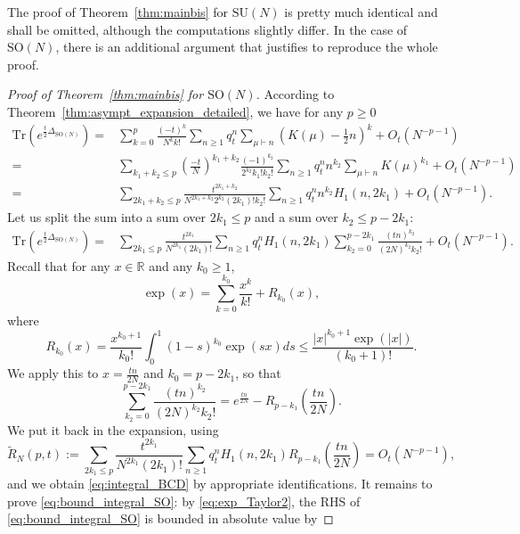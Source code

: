 \documentclass[11pt,a4paper,reqno]{article}
\theoremstyle{definition}
\theoremstyle{remark}
\newcommand\SU{{\mathrm{SU}}}
\newcommand\SO{{\mathrm{SO}}}
\newcommand\R{\mathbb{R}}
\newcommand\Tr{\mathrm{Tr}}
\begin{document}
The proof of Theorem~\ref{thm:mainbis} for $\SU(N)$ is pretty much identical and shall be omitted, although the computations slightly differ. In the case of $\SO(N)$, there is an additional argument that justifies to reproduce the whole proof.

\begin{proof}[Proof of Theorem~\ref{thm:mainbis} for $\SO(N)$]
According to Theorem~\ref{thm:asympt_expansion_detailed}, we have for any $p\geq 0$
\begin{align*}
\Tr(e^{\frac{t}{2}\Delta_{\SO(N)}})= & \sum_{k=0}^p\frac{(-t)^k}{N^kk!}\sum_{n\geq 1}q_t^n\sum_{\mu\vdash n}\left(K(\mu)-\frac12n\right)^k+O_t(N^{-p-1})\\
= & \sum_{k_1+k_2\leq p}\left(\frac{-t}{N}\right)^{k_1+k_2}\frac{(-1)^{k_2}}{2^{k_2}k_1!k_2!}\sum_{n\geq 1}q_t^nn^{k_2}\sum_{\mu\vdash n}K(\mu)^{k_1}+O_t(N^{-p-1})\\
= & \sum_{2k_1+k_2\leq p}\frac{t^{2k_1+k_2}}{N^{2k_1+k_2}2^{k_2}(2k_1)!k_2!}\sum_{n\geq 1}q_t^nn^{k_2}H_1(n,2k_1)+O_t(N^{-p-1}).
\end{align*}
Let us split the sum into a sum over $2k_1\leq p$ and a sum over $k_2\leq p-2k_1$:
\begin{align*}
\Tr(e^{\frac{t}{2}\Delta_{\SO(N)}})= & \sum_{2k_1\leq p}\frac{t^{2k_1}}{N^{2k_1}(2k_1)!}\sum_{n\geq 1}q_t^nH_1(n,2k_1) \sum_{k_2=0}^{p-2k_1}\frac{(tn)^{k_2}}{(2N)^{k_2}k_2!}+O_t(N^{-p-1}).
\end{align*}
Recall that for any $x\in\R$ and any $k_0\geq 1$,
\begin{equation}\label{eq:exp_Taylor}
\exp(x)=\sum_{k=0}^{k_0}\frac{x^k}{k!}+R_{k_0}(x),
\end{equation}
where
\begin{equation}\label{eq:exp_Taylor2}
R_{k_0}(x)=\frac{x^{k_0+1}}{k_0!}\int_0^1(1-s)^{k_0}\exp(sx)ds\leq \frac{\vert x\vert^{k_0+1}\exp(\vert x\vert)}{(k_0+1)!}.
\end{equation}
We apply this to $x=\frac{tn}{2N}$ and $k_0=p-2k_1$, so that
\[
\sum_{k_2=0}^{p-2k_1}\frac{(tn)^{k_2}}{(2N)^{k_2}k_2!}=e^{\frac{tn}{2N}}-R_{p-k_1}\left(\frac{tn}{2N}\right).
\]
We put it back in the expansion, using
\begin{equation}\label{eq:bound_integral_SO}
\tilde{R}_{N}(p,t):=\sum_{2k_1\leq p}\frac{t^{2k_1}}{N^{2k_1}(2k_1)!}\sum_{n\geq 1}q_t^n H_1(n,2k_1)R_{p-k_1}\left(\frac{tn}{2N}\right)=O_t(N^{-p-1}),
\end{equation}
and we obtain \eqref{eq:integral_BCD} by appropriate identifications. It remains to prove \eqref{eq:bound_integral_SO}: by \eqref{eq:exp_Taylor2}, the RHS of \eqref{eq:bound_integral_SO} is bounded in absolute value by

\end{proof}
\end{document}
